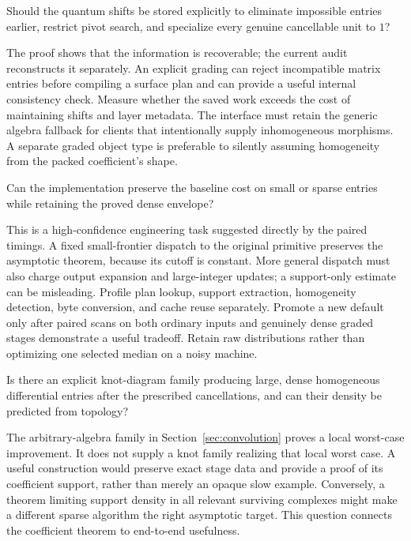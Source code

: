 \begin{question}
Should the quantum shifts be stored explicitly to eliminate impossible
entries earlier, restrict pivot search, and specialize every genuine
cancellable unit to $1$?
\end{question}
The proof shows that the information is recoverable; the current audit
reconstructs it separately. An explicit grading can reject incompatible
matrix entries before compiling a surface plan and can provide a useful
internal consistency check. Measure whether the saved work exceeds the
cost of maintaining shifts and layer metadata. The interface must retain
the generic algebra fallback for clients that intentionally supply
inhomogeneous morphisms. A separate graded object type is preferable to
silently assuming homogeneity from the packed coefficient's shape.

\begin{question}
Can the implementation preserve the baseline cost on small or sparse
entries while retaining the proved dense envelope?
\end{question}
This is a high-confidence engineering task suggested directly by the
paired timings. A fixed small-frontier dispatch to the original primitive
preserves the asymptotic theorem, because its cutoff is constant.
More general dispatch must also charge output expansion and large-integer
updates; a support-only estimate can be misleading. Profile plan lookup,
support extraction, homogeneity detection, byte conversion, and cache
reuse separately. Promote a new default only after paired scans on both
ordinary inputs and genuinely dense graded stages demonstrate a useful
tradeoff. Retain raw distributions rather than optimizing one selected
median on a noisy machine.

\begin{question}
Is there an explicit knot-diagram family producing large, dense
homogeneous differential entries after the prescribed cancellations,
and can their density be predicted from topology?
\end{question}
The arbitrary-algebra family in Section~\ref{sec:convolution} proves a
local worst-case improvement. It does not supply a knot family realizing
that local worst case. A useful construction would preserve exact stage
data and provide a proof of its coefficient support, rather than merely
an opaque slow example. Conversely, a theorem limiting support density
in all relevant surviving complexes might make a different sparse
algorithm the right asymptotic target. This question connects the
coefficient theorem to end-to-end usefulness.

